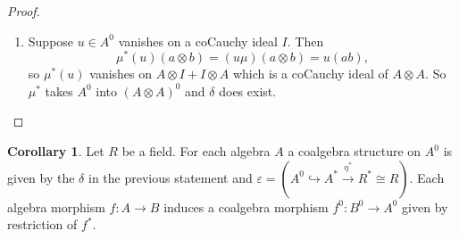 \documentclass[8pt]{article}
\theoremstyle{definition}
\theoremstyle{definition}
\theoremstyle{definition}
\theoremstyle{definition}
\theoremstyle{definition}
\theoremstyle{definition}
\theoremstyle{definition}
\theoremstyle{definition}
\theoremstyle{definition}
\theoremstyle{definition}
\theoremstyle{definition}
\theoremstyle{definition}
\theoremstyle{definition}
\theoremstyle{definition}
\newtheorem{col}{Corollary}[section]
\theoremstyle{question}
\begin{document}
\begin{proof}
\begin{enumerate}
\begin{center}
      $A \otimes_R J + I \otimes_R B = \operatorname{ker}(A \otimes_R B \to (A/I) \otimes_R (B/J))$.
    \end{center}
    Take $w \in (A \otimes B)^0$ which is zero on some coCauchy $K$. Then $w$ is zero on $A \otimes J + I \otimes B \subseteq K$.
    Therefore:
    \[
    A \otimes B/(A \otimes J + I \otimes B) \cong A/I \otimes B/J
    \]
    so there is a unique $\overline{w}$:
    \[
    \begin{tikzcd}
      A \otimes B \ar[rr, "w"] \ar[dr, "\rho \otimes \rho"'] && R \\
      & (A/I) \otimes (B/J) \ar[ur, "\overline{w}"'] 
    \end{tikzcd}
    \]
    Since $A/I$ and $B/J$ are finite dimensional, therefore we have:
    \[
    (A/I)^* \otimes (B/J)^* \xrightarrow{\cong} (A/I \otimes B/J)^*
    \]
    and thus there is some $\Sigma \overline{h}_i \otimes \overline{k}_i$ corresponding to $\overline{w}$.
    For $x \in A/I$ and $y \in B/J$ we have
    \[
    \overline{w}(x \otimes y) = \sum \limits_i \overline{h}_i(x) \overline{k}_i(y).
    \]
    for $x \in A/I$ and $y \in B/J$. Define the composite 
    $h_i = \overline{h}_i \circ \rho : A \to A/I \to R$ and similarly define
    $k_i = \overline{k}_i \circ \rho : B \to B/J \to R$. These are in $A^0$ and $B^0$
    respectively since they are zero on $I$ and $J$. Thus:
    \[
    \sum \limits_i h_i \otimes k_i \in A^0 \otimes B^0.
    \]
    Conversely, if $h \in A^0$ and $k \in B^0$ vanish on coCauchy $I$ and $J$ (ideals 
    of $A$ and $B$), then $h \otimes k$ vanishes $A \otimes J + I \otimes B$, which is a coCauchy
    ideal of $A \otimes B$.
    \item Suppose $u \in A^0$ vanishes on a coCauchy ideal $I$. Then
    \[
    \mu^*(u)(a \otimes b) = (u \mu)(a \otimes b) = u(ab),
    \]
    so $\mu^*(u)$ vanishes on $A \otimes I + I \otimes A$ which is a coCauchy ideal of $A \otimes A$.
    So $\mu^*$ takes $A^0$ into $(A \otimes A)^0$ and $\delta$ does exist.
  \end{enumerate}
\end{proof} 

\begin{col}
  Let $R$ be a field. For each algebra $A$ a coalgebra structure on $A^0$
  is given by the $\delta$ in the previous statement and 
  $\varepsilon = (A^0 \hookrightarrow A^* \xrightarrow{\eta^*} R^* \cong R)$.
  Each algebra morphism $f : A \to B$ induces a coalgebra morphism $f^0 : B^0 \to A^0$
  given by restriction of $f^*$.
\end{col}
\end{document}
